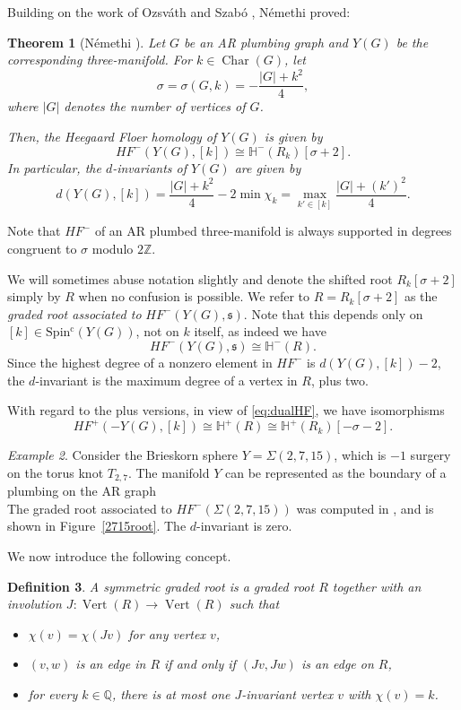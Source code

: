 \documentclass[11 pt]{amsart}
\newtheorem {theorem}{Theorem}[section]
\newtheorem {definition}[theorem]{Definition}
\theoremstyle{remark}
\newtheorem {example}[theorem]{Example}
\newcommand\Z{\mathbb{Z}}
\newcommand\Q{\mathbb{Q}}
\def\Spinc {{\operatorname{Spin^c}}}
\def\s{\mathfrak s}
\def\He{\mathbb{H}}
\def\HF {\mathit{HF}}
\newcommand\HFp {\HF^+}
\newcommand \HFm {\HF^-}
\def\Vert{\operatorname{Vert}}
\def\Char{\operatorname{Char}}
\begin{document}
Building on the work of Ozsv\'ath and Szab\'o \cite{Plumbed}, N\'emethi proved:
\begin{theorem}[N\'emethi \cite{NemethiOS}]
\label{thm:latticeisom}
Let $G$ be an AR plumbing graph and $Y(G)$ be the corresponding three-manifold. For $k \in \Char(G)$, let 
$$\sigma = \sigma(G, k) = -\frac{|G| + k^2}{4},$$
where $|G|$ denotes the number of vertices of $G$.

Then, the Heegaard Floer homology of $Y(G)$ is given by
\begin{equation}
\label{eq:HFmAR}
\HFm(Y(G), [k]) \cong \He^-(R_k)[\sigma+2].
\end{equation}
In particular, the $d$-invariants of $Y(G)$ are given by
$$ d(Y(G), [k]) = \frac{|G| + k^2}{4} - 2\min \chi_k= \max_{k' \in [k]}\frac{|G| + (k')^2}{4}.$$
\end{theorem}

Note that $\HFm$ of an AR plumbed three-manifold is always supported in degrees congruent to $\sigma$ modulo $2\Z$.

We will sometimes abuse notation slightly and denote the shifted root $R_k[\sigma + 2]$ simply by $R$ when no confusion is possible. We refer to $R = R_k[\sigma + 2]$ as the {\em graded root associated to} $\HFm(Y(G), \s)$. Note that this depends only on $[k] \in \Spinc(Y(G))$, not on $k$ itself, as indeed we have
$$ \HFm(Y(G), \s) \cong \He^-(R).$$
Since the highest degree of a nonzero element in $\HFm$ is $d(Y(G), [k])-2$, the $d$-invariant is the maximum degree of a vertex in $R$, plus two.

With regard to the plus versions, in view of \eqref{eq:dualHF}, we have isomorphisms
\begin{equation}
\label{eq:HFpAR}
\HFp(-Y(G), [k]) \cong \He^+(R) \cong \He^+(R_k)[-\sigma-2].
\end{equation}

\begin{example}
Consider the Brieskorn sphere $Y=\Sigma(2,7,15)$, which is $-1$ surgery on the torus knot $T_{2,7}$. The manifold $Y$ can be represented as the boundary of a plumbing on the AR graph
$$$$
The graded root associated to $\HFm(\Sigma(2, 7, 15))$ was computed in \cite{NemethiGRS, Tweedy}, and is shown in Figure~\ref{2715root}. The $d$-invariant is zero.
\end{example}
 
 We now introduce the following concept.
\begin{definition}
A {\em symmetric graded root} is a graded root $R$ together with an involution $J : \Vert(R) \to \Vert(R)$ such that
\begin{itemize}
\item $ \chi(v) = \chi(Jv)$ for any vertex $v$,
\item $(v, w)$ is an edge in $R$ if and only if $(Jv, Jw)$ is an edge on $R$,
\item for every $k \in \Q$, there is at most one $J$-invariant vertex $v$ with $\chi(v) = k$.
\end{itemize} 
\end{definition}
\end{document}
